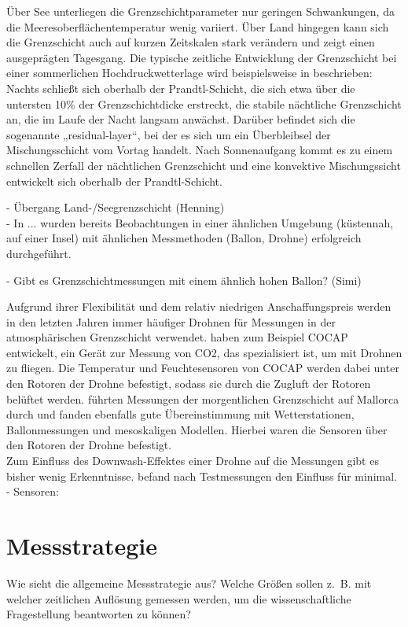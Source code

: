 \documentclass[a4paper,11pt,DIV=calc,tablecaptionabove,headinclude,twoside]{article}
\begin{document}
Über See unterliegen die Grenzschichtparameter nur geringen Schwankungen, da die Meeresoberflächentemperatur wenig variiert. Über Land hingegen kann sich die Grenzschicht auch auf kurzen Zeitskalen stark verändern und zeigt einen ausgeprägten Tagesgang. Die typische zeitliche Entwicklung der Grenzschicht bei einer sommerlichen Hochdruckwetterlage wird beispielsweise in \cite{stull1988introduction} beschrieben: Nachts schließt sich oberhalb der Prandtl-Schicht, die sich etwa über die untersten 10\% der Grenzschichtdicke erstreckt, die stabile nächtliche Grenzschicht an, die im Laufe der Nacht langsam anwächst. Darüber befindet sich die sogenannte „residual-layer“, bei der es sich um ein Überbleibsel der Mischungsschicht vom Vortag handelt. Nach Sonnenaufgang kommt es zu einem schnellen Zerfall der nächtlichen Grenzschicht und eine konvektive Mischungssicht entwickelt sich oberhalb der Prandtl-Schicht.

- Übergang Land-/Seegrenzschicht (Henning)\\ %
- In ... wurden bereits Beobachtungen in einer ähnlichen Umgebung (küstennah, auf einer Insel) mit ähnlichen Messmethoden (Ballon, Drohne) erfolgreich durchgeführt.  

- Gibt es Grenzschichtmessungen mit einem ähnlich hohen Ballon? (Simi)

Aufgrund ihrer Flexibilität und dem relativ niedrigen Anschaffungspreis werden
in den letzten Jahren immer häufiger Drohnen für Messungen in der atmosphärischen
Grenzschicht verwendet.
\citet{kunz2018cocap} haben zum Beispiel COCAP entwickelt, ein Gerät zur Messung von
CO2, das spezialisiert ist, um mit Drohnen zu fliegen. Die Temperatur und Feuchtesensoren
von COCAP werden dabei unter den Rotoren der Drohne befestigt, sodass sie durch die 
Zugluft der Rotoren belüftet werden. \citet{jimenez2016morning} führten Messungen der morgentlichen Grenzschicht
auf Mallorca durch und fanden ebenfalls gute Übereinstimmung mit Wetterstationen, 
Ballonmessungen und mesoskaligen Modellen. Hierbei waren die Sensoren über den Rotoren
der Drohne befestigt.\\
Zum Einfluss des Downwash-Effektes einer Drohne auf die Messungen gibt es bisher
wenig Erkenntnisse. \citet{zhou2017small} befand nach Testmessungen den Einfluss für
minimal.\\

- Sensoren:





\section{Messstrategie}
Wie sieht die allgemeine Messstrategie aus? Welche Größen sollen z.~B. mit welcher zeitlichen Auflösung gemessen werden, um die wissenschaftliche Fragestellung beantworten zu können?
\end{document}
